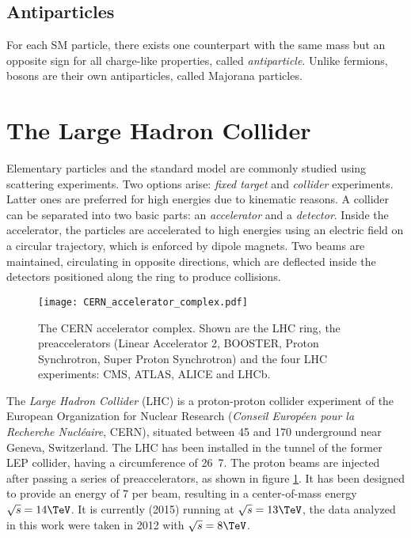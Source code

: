 \subsection{Antiparticles}
For each SM particle, there exists one counterpart with the same mass but an opposite sign for all charge-like properties, called \emph{antiparticle}. Unlike fermions, bosons are their own antiparticles, called Majorana particles.

\section{The Large Hadron Collider}
Elementary particles and the standard model are commonly studied using scattering experiments. Two options arise: \emph{fixed target} and \emph{collider} experiments. Latter ones are preferred for high energies due to kinematic reasons.
A collider can be separated into two basic parts: an \emph{accelerator} and a \emph{detector}.
Inside the accelerator, the particles are accelerated to high energies using an electric field on a circular trajectory, which is enforced by dipole magnets. Two beams are maintained, circulating in opposite directions, which are deflected inside the detectors positioned along the ring to produce collisions.

\begin{figure}[htbp]
	\center
	\texttt{[image: CERN\_accelerator\_complex.pdf]}
	\caption{The CERN accelerator complex\cite[modified]{Marcastel2013CERNs}. Shown are the LHC ring, the preaccelerators (Linear Accelerator 2, BOOSTER, Proton Synchrotron, Super Proton Synchrotron) and the four LHC experiments: CMS, ATLAS, ALICE and LHCb.}
	\label{fig:cern_accelerator_complex}
\end{figure}

The \emph{Large Hadron Collider} (LHC) is a proton-proton collider experiment of the European Organization for Nuclear Research (\emph{Conseil Européen pour la Recherche Nucléaire}, CERN), situated between \unit{45}{\meter} and \unit{170}{\meter} underground near Geneva, Switzerland. The LHC has been installed in the tunnel of the former LEP collider, having a circumference of \unit{26.7}{\kilo\meter}\cite{BV2009CERN,EB2008LHC}. The proton beams are injected after passing a series of preaccelerators, as shown in figure \ref{fig:cern_accelerator_complex}. It has been designed to provide an energy of \unit{7}{\TeV} per beam, resulting in a center-of-mass energy $\sqrt{s} = \unit{14}{\TeV}$. It is currently (2015) running at $\sqrt{s} = \unit{13}{\TeV}$, the data analyzed in this work were taken in 2012 with $\sqrt{s} = \unit{8}{\TeV}$.

